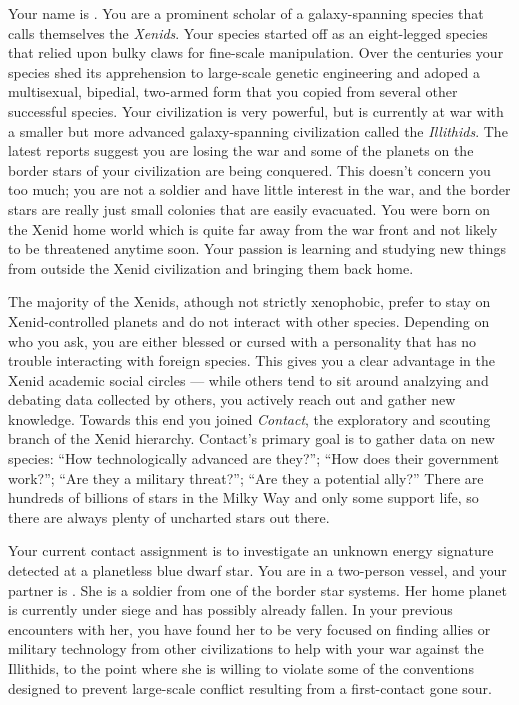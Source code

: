 \documentclass[char]{guildcamp1}
\begin{document}
\name{\cPassive{}}

Your name is \cPassive{\they}. You are a prominent scholar of a galaxy-spanning species that calls themselves the \emph{Xenids}. Your species started off as an eight-legged species that relied upon bulky claws for fine-scale manipulation. Over the centuries your species shed its apprehension to large-scale genetic engineering and adoped a multisexual, bipedial, two-armed form that you copied from several other successful species. Your civilization is very powerful, but is currently at war with a smaller but more advanced galaxy-spanning civilization called the \emph{Illithids}. The latest reports suggest you are losing the war and some of the planets on the border stars of your civilization are being conquered. This doesn't concern you too much; you are not a soldier and have little interest in the war, and the border stars are really just small colonies that are easily evacuated. You were born on the Xenid home world which is quite far away from the war front and not likely to be threatened anytime soon. Your passion is learning and studying new things from outside the Xenid civilization and bringing them back home.

The majority of the Xenids, athough not strictly xenophobic, prefer to stay on Xenid-controlled planets and do not interact with other species. Depending on who you ask, you are either blessed or cursed with a personality that has no trouble interacting with foreign species. This gives you a clear advantage in the Xenid academic social circles --- while others tend to sit around analzying and debating data collected by others, you actively reach out and gather new knowledge. Towards this end you joined \emph{Contact}, the exploratory and scouting branch of the Xenid hierarchy. Contact's primary goal is to gather data on new species: ``How technologically advanced are they?''; ``How does their government work?''; ``Are they a military threat?''; ``Are they a potential ally?'' There are hundreds of billions of stars in the Milky Way and only some support life, so there are always plenty of uncharted stars out there.

Your current contact assignment is to investigate an unknown energy signature detected at a planetless blue dwarf star. You are in a two-person vessel, and your partner is \cAlien{\they}. She is a soldier from one of the border star systems. Her home planet is currently under siege and has possibly already fallen. In your previous encounters with her, you have found her to be very focused on finding allies or military technology from other civilizations to help with your war against the Illithids, to the point where she is willing to violate some of the conventions designed to prevent large-scale conflict resulting from a first-contact gone sour.
\end{document}

